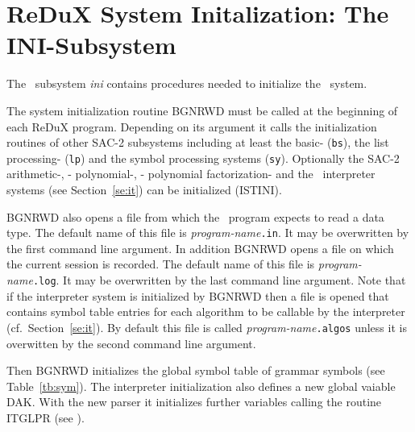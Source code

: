 \section{ReDuX System Initalization: The INI-Subsystem}
\label{se:ini} %

The \redux\ subsystem {\em ini} contains procedures needed to
initialize the \redux\ system.

The system initialization routine BGNRWD must be called at the beginning of
each ReDuX program.
Depending on its argument it calls the initialization routines 
of other SAC-2 subsystems
including at least the basic- ({\tt bs}), the list processing- ({\tt lp})
and the symbol processing systems ({\tt sy}).
Optionally the SAC-2 arithmetic-, - polynomial-, - polynomial factorization- 
and the \redux\ interpreter systems (see Section~\ref{se:it})
can be initialized (ISTINI).

BGNRWD also opens a file from which the \redux\ program expects to read
a data type.
The default name of this file is {\it program-name}{\tt .in}.
It may be overwritten by the first command line argument.
In addition BGNRWD opens a file on which the current session is recorded.
The default name of this file is {\it program-name}{\tt .log}.
It may be overwritten by the last command line argument.
Note that if the interpreter system is initialized by BGNRWD
then a file is opened that contains symbol table entries for each algorithm 
to be callable by the interpreter (cf.\ Section~\ref{se:it}).
By default this file is called {\it program-name}{\tt .algos} unless it
is overwitten by the second command line argument.

Then BGNRWD initializes the global symbol table of grammar symbols 
(see Table~\ref{tb:sym}).
The interpreter initialization also defines a new global vaiable DAK.
With the new parser it initializes further variables calling the routine
ITGLPR (see \NPPG).

